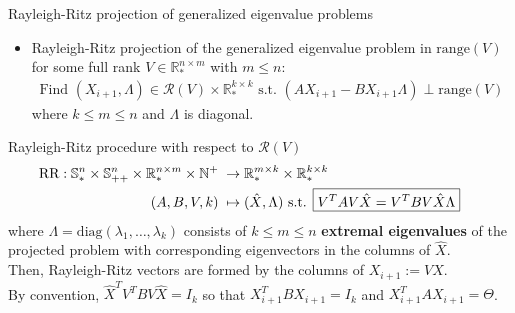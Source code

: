 \documentclass[t,usepdftitle=false]{beamer}
\begin{document}
\begin{frame}{Rayleigh-Ritz projection of generalized eigenvalue problems}
	\begin{itemize}
	\item Rayleigh-Ritz projection of the generalized eigenvalue problem in $\text{range}(V)$ for some full rank $V\in\mathbb{R}^{n\times m}_*$ with $m\leq n$:
	\begin{align*}
	\text{Find }
	(X_{i+1},\Lambda)\in\mathcal{R}(V)\times \mathbb{R}_*^{k\times k}
	\text{ s.t. }
	(AX_{i+1}-BX_{i+1}\Lambda)\perp\text{range}(V)
	\end{align*}
	where $k\leq m\leq n$ and $\Lambda$ is diagonal.
	\end{itemize}
	\vspace{-.05cm}
	\begin{block}{Rayleigh-Ritz procedure with respect to $\mathcal{R}(V)$}
		\vspace{-.3cm}
		\begin{align*}
			\hspace{-.5cm}
			\text{RR}:
			\mathbb{S}_*^{n}\times\mathbb{S}_{++}^{n}\times\mathbb{R}_*^{n\times m}\times\mathbb{N}^+&\;\rightarrow\mathbb{R}_*^{m\times k}\times\mathbb{R}_*^{k\times k}\\
			(A,B,V,k)&\;\mapsto (\hat{X},\Lambda)
			\text{ s.t. }
			\boxed{V^TAV\hat{X}=V^TBV\hat{X}\Lambda }
		\end{align*}
		where $\Lambda=\mathrm{diag}(\lambda_1,\dots,\lambda_k)$ consists of $k\leq m\leq n$ \textbf{extremal eigenvalues}	
		of the projected problem with corresponding eigenvectors in the columns of $\hat{X}\!.\!\!$\\
		\smallskip
		Then, Rayleigh-Ritz vectors are formed by the columns of $X_{i+1}:=V\hat{X}$.\\
		\smallskip
		By convention, $\hat{X}^TV^TBV\hat{X}=I_{k}$ so that $X_{i+1}^TBX_{i+1}=I_k$ and $X_{i+1}^TAX_{i+1}=\Theta$.
	\end{block}
\end{frame}
\end{document}
